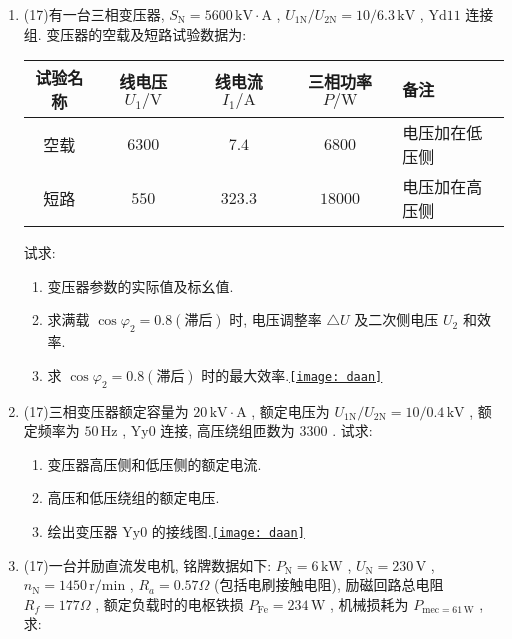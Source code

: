 \documentclass[lang=cn,11pt,marginpar=margintrue]{elegantbook}%
\newcommand{\daan}[1]{\hfill\hyperref[#1]{\texttt{[image: daan]}}}
\newcommand{\zt}[1]{\,\mathrm{#1}}
\newcommand{\NN}{\mathrm{N}}
\begin{document}
\begin{enumerate}
		\begin{enumerate}
			\item 转子漏阻抗的折算值 $R_2'$ 及 $X_{2\sigma}'$ .
			\item 用 $\Gamma$  型等效电路计算额定电流.
			\item 额定运行时的功率因数 $\cos\varphi_{\NN}$ 和效率 $\eta_{\NN}$ .\daan{js:22}
		\end{enumerate}
	\item (17)有一台三相变压器, $S_{\NN}=5600\zt{kV\cdot A}$ , $U_{1\NN}/U_{2\NN}=10/6.3\zt{kV}$ , $\mathrm{Yd}11$ 连接组. 变压器的空载及短路试验数据为:
		\begin{center}
			\begin{tabularx}{0.9\textwidth}{ccccZ}
				\toprule
				试验名称 & 线电压 $U_1/\mathrm{V}$ & 线电流 $I_1/\mathrm{A}$ & 三相功率 $P/\mathrm{W}$ & 备注\\
				\midrule
				空载 & $6300$ & $7.4$ & $6800$ & 电压加在低压侧\\
				短路 & $550$ & $323.3$ & $18000$ & 电压加在高压侧\\
				\bottomrule
			\end{tabularx}
		\end{center}
		试求:
		\begin{enumerate}
			\item 变压器参数的实际值及标幺值.
			\item 求满载 $\cos\varphi_2=0.8(\text{滞后})$ 时, 电压调整率 $\triangle U$ 及二次侧电压 $U_2$ 和效率.
			\item 求 $\cos\varphi_2=0.8(\text{滞后})$ 时的最大效率.\daan{js:23}
		\end{enumerate}
	\item (17)三相变压器额定容量为 $20\zt{kV\cdot A}$ , 额定电压为 $U_{1\NN}/U_{2\NN}=10/0.4\zt{kV}$ , 额定频率为 $50\zt{Hz}$ , $\mathrm{Yy}0$ 连接, 高压绕组匝数为 $3300$ . 试求:
		\begin{enumerate}
			\item 变压器高压侧和低压侧的额定电流.
			\item 高压和低压绕组的额定电压.
			\item 绘出变压器 $\mathrm{Yy}0$ 的接线图.\daan{js:24}
		\end{enumerate}
	\item (17)一台并励直流发电机, 铭牌数据如下: $P_{\NN}=6\zt{kW}$ , $U_{\NN}=230\zt{V}$ , $n_{\NN}=1450\zt{r/min}$ , $R_a=0.57\Omega$ (包括电刷接触电阻), 励磁回路总电阻 $R_f=177\Omega$ , 额定负载时的电枢铁损 $P_{\mathrm{Fe}}=234\zt{W}$ , 机械损耗为 $P_{\mathrm{mec}=61\zt{W}}$ , 求:

\end{enumerate}
\end{document}
